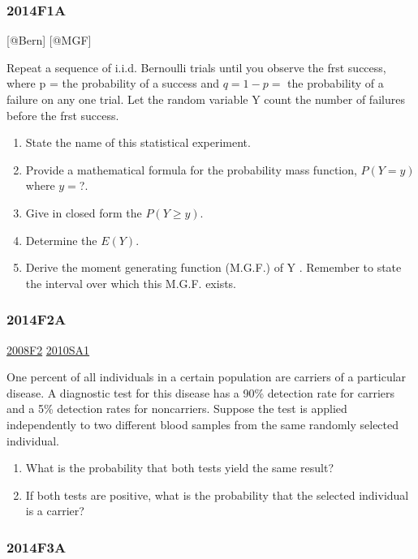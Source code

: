 \documentclass[6pt,twocolumn,Portrait]{article}
\begin{document}
\hypertarget{f1a-1}{%
\subsubsection{2014F1A}\label{f1a-1}}

{[}@Bern{]} {[}@MGF{]}

Repeat a sequence of i.i.d. Bernoulli trials until you observe the frst
success, where p = the probability of a success and \(q=1-p=\) the
probability of a failure on any one trial. Let the random variable Y
count the number of failures before the frst success.

\begin{enumerate}
\def\labelenumi{(\alph{enumi})}
\item
  State the name of this statistical experiment.
\item
  Provide a mathematical formula for the probability mass function,
  \(P(Y=y)\) where \(y=\)?.
\item
  Give in closed form the \(P(Y\ge y)\).
\item
  Determine the \(E(Y)\).
\item
  Derive the moment generating function (M.G.F.) of Y . Remember to
  state the interval over which this M.G.F. exists.
\end{enumerate}

\hypertarget{f2a-1}{%
\subsubsection{2014F2A}\label{f2a-1}}

\protect\hyperlink{f2-3}{2008F2} \protect\hyperlink{sa1-1}{2010SA1}

One percent of all individuals in a certain population are carriers of a
particular disease. A diagnostic test for this disease has a 90\%
detection rate for carriers and a 5\% detection rates for noncarriers.
Suppose the test is applied independently to two different blood samples
from the same randomly selected individual.

\begin{enumerate}
\def\labelenumi{(\alph{enumi})}
\item
  What is the probability that both tests yield the same result?
\item
  If both tests are positive, what is the probability that the selected
  individual is a carrier?
\end{enumerate}

\hypertarget{f3a-1}{%
\subsubsection{2014F3A}\label{f3a-1}}
\end{document}
